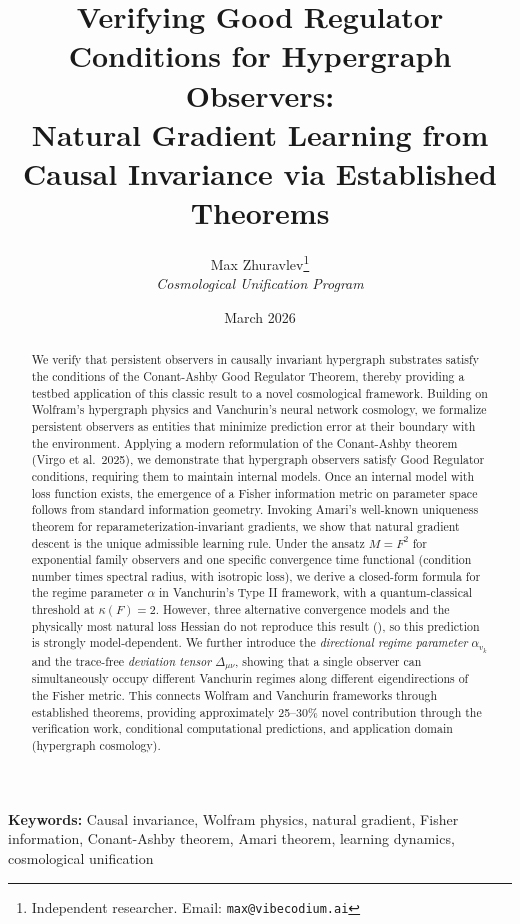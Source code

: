\documentclass[11pt,a4paper]{article}
\title{\textbf{Verifying Good Regulator Conditions for Hypergraph Observers:} \\[0.3em]
\large Natural Gradient Learning from Causal Invariance via Established Theorems}
\author{
Max Zhuravlev\thanks{Independent researcher. Email: \texttt{max@vibecodium.ai}} \\
\small \textit{Cosmological Unification Program}
}
\date{March 2026}
\theoremstyle{plain}
\theoremstyle{definition}
\theoremstyle{remark}
\begin{document}
\maketitle


\begin{abstract}
We verify that persistent observers in causally invariant hypergraph substrates satisfy the conditions of the Conant-Ashby Good Regulator Theorem, thereby providing a testbed application of this classic result to a novel cosmological framework. Building on Wolfram's hypergraph physics and Vanchurin's neural network cosmology, we formalize persistent observers as entities that minimize prediction error at their boundary with the environment. Applying a modern reformulation of the Conant-Ashby theorem (Virgo et al.~2025), we demonstrate that hypergraph observers satisfy Good Regulator conditions, requiring them to maintain internal models. Once an internal model with loss function exists, the emergence of a Fisher information metric on parameter space follows from standard information geometry. Invoking Amari's well-known uniqueness theorem for reparameterization-invariant gradients, we show that natural gradient descent is the unique admissible learning rule. Under the ansatz $M = F^2$ for exponential family observers and one specific convergence time functional (condition number times spectral radius, with isotropic loss), we derive a closed-form formula for the regime parameter $\alpha$ in Vanchurin's Type II framework, with a quantum-classical threshold at $\kappa(F) = 2$. However, three alternative convergence models and the physically most natural loss Hessian do not reproduce this result (), so this prediction is strongly model-dependent. We further introduce the \emph{directional regime parameter} $\alpha_{v_k}$ and the trace-free \emph{deviation tensor} $\Delta_{\mu\nu}$, showing that a single observer can simultaneously occupy different Vanchurin regimes along different eigendirections of the Fisher metric. This connects Wolfram and Vanchurin frameworks through established theorems, providing approximately 25--30\% novel contribution through the verification work, conditional computational predictions, and application domain (hypergraph cosmology).
\end{abstract}

\noindent\textbf{Keywords:} Causal invariance, Wolfram physics, natural gradient, Fisher information, Conant-Ashby theorem, Amari theorem, learning dynamics, cosmological unification
\end{document}
